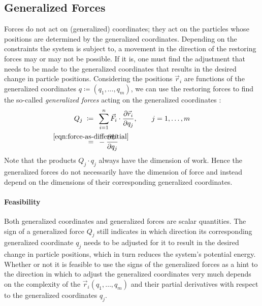 \subsection{Generalized Forces}

Forces do not act on (generalized) coordinates; they act on the particles whose positions are determined by the generalized coordinates. Depending on the constraints the system is subject to, a movement in the direction of the restoring forces may or may not be possible. If it is, one must find the adjustment that needs to be made to the generalized coordinates that results in the desired change in particle positions. Considering the positions ${\vec{r}_i}$ are functions of the generalized coordinates ${q \coloneqq (q_1, \ldots, q_m)}$, we can use the restoring forces to find the so-called \emph{generalized forces} acting on the generalized coordinates \cite{Fitzpatrick}:
%
\begin{align}
  Q_j \;\coloneqq &\;\; \sum_{i=1}^{n}{\vec{F}_i \cdot \frac{\partial \vec{r}_i}{\partial q_j}}, \qquad j = 1, \ldots, m
  \label{eqn:generalized-forces-definition} \\
  \;\stackrel{\mathclap{\eqref{eqn:force-as-differential}}}{=} &\;\; -\frac{\partial U}{\partial q_j}
  \label{eqn:generalized-forces-as-gradient}
\end{align}
%
Note that the products ${Q_j \cdot q_j}$ always have the dimension of work. Hence the generalized forces do not necessarily have the dimension of force and instead depend on the dimensions of their corresponding generalized coordinates.



\paragraph{Feasibility}

Both generalized coordinates and generalized forces are scalar quantities. The sign of a generalized force ${Q_j}$ still indicates in which direction its corresponding generalized coordinate ${q_j}$ needs to be adjusted for it to result in the desired change in particle positions, which in turn reduces the system's potential energy. Whether or not it is feasible to use the signs of the generalized forces as a hint to the direction in which to adjust the generalized coordinates very much depends on the complexity of the ${\vec{r}_i(q_1, \ldots, q_m)}$ and their partial derivatives with respect to the generalized coordinates ${q_j}$.


